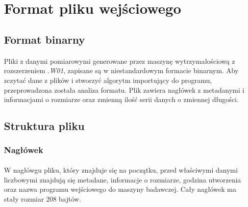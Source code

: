 \documentclass[12pt]{report}
\begin{document}
	\section{Format pliku wejściowego}
	\subsection{Format binarny}
	\paragraph{}
	Pliki z danymi pomiarowymi generowane przez maszynę wytrzymałościową z rozszerzeniem \textit{.W01}, zapisane są w niestandardowym formacie binarnym. Aby zczytać dane z plików i stworzyć algorytm importujący do programu, przeprowadzona została analiza formatu. Plik zawiera nagłówek z metadanymi i informacjami o rozmiarze oraz zmienną ilość serii danych o zmiennej długości.
	
	\subsection{Struktura pliku}
	
	\subsubsection{Nagłówek}
	\paragraph{}
	W nagłówgu pliku, który znajduje się na początku, przed właściwymi danymi liczbowymi znajdują się metadane, informacje o rozmiarze, godzina utworzenia oraz nazwa programu wejściowego do maszyny badawczej. Cały nagłówek ma stały rozmiar 208 bajtów.
	
\end{document}

